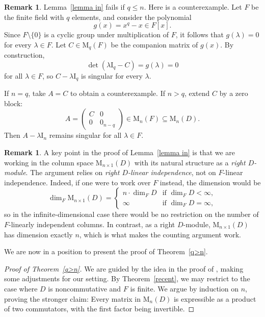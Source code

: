 \documentclass[11pt]{article}
\theoremstyle{definition}
\newtheorem{remark}[theorem]{Remark}%
\begin{document}
{{{{				\begin{remark}
					Lemma~\ref{lemma in} fails if $q \le n$. Here is a counterexample. Let $F$ be the finite field with $q$ elements, and consider the polynomial
					\[
					g(x) = x^q - x \in F[x].
					\]
					Since $F\setminus\{0\}$ is a cyclic group under multiplication of $F$, it follows that $g(\lambda) = 0$ for every $\lambda \in F$. Let $C \in \mathrm{M}_q(F)$ be the companion matrix of $g(x)$. By construction,
					\[
					\det(\lambda \mathrm{I}_q - C) = g(\lambda) = 0
					\]
					for all $\lambda \in F$, so $C - \lambda \mathrm{I}_q$ is singular for every $\lambda$.
					
					If $n = q$, take $A = C$ to obtain a counterexample. If $n > q$, extend $C$ by a zero block:
					\[
					A = \begin{pmatrix}
						C & 0 \\[3pt]
						0 & 0_{n-q}
					\end{pmatrix} \in \mathrm{M}_n(F) \subseteq \mathrm{M}_n(D).
					\]
					Then $A - \lambda \mathrm{I}_n$ remains singular for all $\lambda \in F$.
				\end{remark}
				
				\begin{remark}
					A key point in the proof of Lemma~\ref{lemma in} is that we are working in the column space
					\(\mathrm{M}_{n\times 1}(D)\) with its natural structure as a \emph{right \(D\)-module}.
					The argument relies on \emph{right \(D\)-linear independence}, not on \(F\)-linear independence.
					Indeed, if one were to work over \(F\) instead, the dimension would be
					\[
					\dim_F \mathrm{M}_{n\times 1}(D) =
					\begin{cases}
						n \cdot \dim_F D& \text{if } \dim_F D < \infty, \\
						\infty& \text{if } \dim_F D = \infty,
					\end{cases}
					\]
					so in the infinite-dimensional case there would be no restriction on the number of
					\(F\)-linearly independent columns.
					In contrast, as a right \(D\)-module, \(\mathrm{M}_{n\times 1}(D)\) has dimension exactly \(n\),
					which is what makes the counting argument work.
				\end{remark}
				
				We are now in a position to present the proof of Theorem~\ref{q>n}.
				
				
				\begin{proof}[Proof of Theorem~\ref{q>n}]
					We are guided by the idea in the proof of \cite[Theorem 4.4]{Pa_Bre_25}, making some adjustments for our setting.  By Theorem~\ref{recent}, we may restrict to the case where $D$ is noncommutative and $F$ is finite.  We argue by induction on $n$, proving the stronger claim:  Every matrix in $\mathrm{M}_n(D)$ is expressible as a product of two commutators, with the first factor being invertible.
					

\end{proof}}}}}
\end{document}

